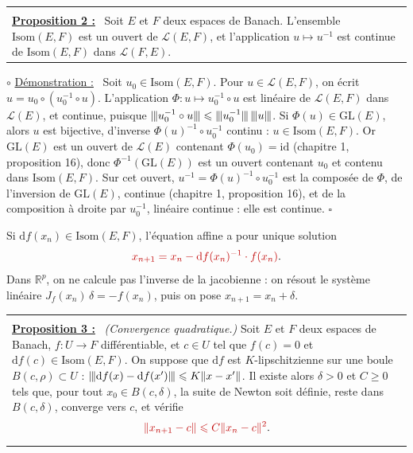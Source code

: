\documentclass[a4paper,twoside]{report}
\makeatletter
\newcommand{\rmath}[1]{\textcolor{rougecours}{#1}}
\newenvironment{cadre}%
 {\par\vspace{2mm}\noindent\begin{tabular}{|@{\hspace{4mm}}p{0.93\textwidth}@{\hspace{4mm}}|}
  \hline \\[-2mm]}%
 {\\[2mm] \hline \end{tabular}\par\vspace{3mm}}
\newcommand{\propo}[1]{\textbf{\underline{Proposition #1 :}}~}
\newenvironment{demo}%
 {\par\needspace{4\baselineskip}\vspace{1mm}\noindent$\circ$ \underline{Démonstration :}~\setlength{\parskip}{3pt plus 1pt}}%
 {\hfill$\square$\par\vspace{2mm}}
\newcommand{\R}{\mathbb{R}}
\newcommand{\id}{\mathrm{id}}                     %
\newcommand{\dd}{\mathrm{d}}                      %
\newcommand{\GL}{\mathrm{GL}}                     %
\newcommand{\norme}[1]{\lVert #1 \rVert}         %
\newcommand{\nop}[1]{|\mkern-1.5mu|\mkern-1.5mu|#1|\mkern-1.5mu|\mkern-1.5mu|}   %
\newcommand{\Bo}{B}                               %
\newcommand{\Lc}{\mathcal{L}}                     %
\newcommand{\Isom}{\mathrm{Isom}}                 %
\newcommand{\Jac}{J}                              %
\makeatother
\begin{document}
\begin{cadre}
\propo{2} Soit $E$ et $F$ deux espaces de Banach. L'ensemble $\Isom(E, F)$ est un ouvert de $\Lc(E, F)$, et l'application $u \mapsto u^{-1}$ est continue de $\Isom(E, F)$ dans $\Lc(F, E)$.
\end{cadre}

\begin{demo}
Soit $u_{0} \in \Isom(E, F)$. Pour $u \in \Lc(E, F)$, on écrit $u = u_{0} \circ (u_{0}^{-1} \circ u)$. L'application $\Phi : u \mapsto u_{0}^{-1} \circ u$ est linéaire de $\Lc(E, F)$ dans $\Lc(E)$, et continue, puisque $\nop{u_{0}^{-1} \circ u} \leqslant \nop{u_{0}^{-1}}\,\nop{u}$. Si $\Phi(u) \in \GL(E)$, alors $u$ est bijective, d'inverse $\Phi(u)^{-1} \circ u_{0}^{-1}$ continu : $u \in \Isom(E, F)$. Or $\GL(E)$ est un ouvert de $\Lc(E)$ contenant $\Phi(u_{0}) = \id$ (chapitre 1, proposition 16), donc $\Phi^{-1}(\GL(E))$ est un ouvert contenant $u_{0}$ et contenu dans $\Isom(E, F)$. Sur cet ouvert, $u^{-1} = \Phi(u)^{-1} \circ u_{0}^{-1}$ est la composée de $\Phi$, de l'inversion de $\GL(E)$, continue (chapitre 1, proposition 16), et de la composition à droite par $u_{0}^{-1}$, linéaire continue : elle est continue.
\end{demo}

\noindent Si $\dd f(x_{n}) \in \Isom(E, F)$, l'équation affine a pour unique solution
\[ \rmath{x_{n + 1} = x_{n} - \dd f(x_{n})^{-1}\cdot f(x_{n})}. \]
Dans $\R^{p}$, on ne calcule pas l'inverse de la jacobienne : on résout le système linéaire $\Jac_{f}(x_{n})\,\delta = -f(x_{n})$, puis on pose $x_{n + 1} = x_{n} + \delta$.

\begin{cadre}
\propo{3} \emph{(Convergence quadratique.)} Soit $E$ et $F$ deux espaces de Banach, $f : U \to F$ différentiable, et $c \in U$ tel que $f(c) = 0$ et $\dd f(c) \in \Isom(E, F)$. On suppose que $\dd f$ est $K$-lipschitzienne sur une boule $\Bo(c, \rho) \subset U$ : $\nop{\dd f(x) - \dd f(x')} \leqslant K\norme{x - x'}$. Il existe alors $\delta > 0$ et $C \geqslant 0$ tels que, pour tout $x_{0} \in \Bo(c, \delta)$, la suite de Newton soit définie, reste dans $\Bo(c, \delta)$, converge vers $c$, et vérifie
\[ \rmath{\norme{x_{n + 1} - c} \leqslant C\norme{x_{n} - c}^{2}}. \]
\end{cadre}
\end{document}
